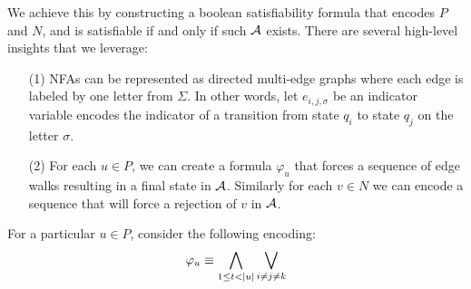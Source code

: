 \documentclass[12pt]{article}
\begin{document}
We achieve this by constructing a boolean satisfiability formula
that encodes \(P\) and \(N\),
and is satisfiable if and only if such \(\mathcal{A}\) exists.
There are several high-level insights that we leverage:
\begin{enumerate}
  \item[(1)]
    NFAs can be represented as directed multi-edge graphs
    where each edge is labeled by one letter from \(\Sigma\).
    In other words, let \(e_{i, j, \sigma}\) be an indicator
    variable encodes the indicator of a transition from state \(q_i\)
    to state \(q_j\) on the letter \(\sigma\).

  \item[(2)]
    For each \(u \in P\),
    we can create a formula \(\varphi_u\) that forces a sequence of edge walks
    resulting in a final state in \(\mathcal{A}\).
    Similarly for each \(v \in N\) we can encode a sequence that will force
    a rejection of \(v\) in \(\mathcal{A}\).

\end{enumerate}

For a particular \(u \in P\), consider the following encoding:
\begin{align*}
  \varphi_u \equiv
    \bigwedge_{1 \leq t < \left\lvert u\right\rvert} \bigvee_{i \neq j \neq k}
\end{align*}
\end{document}
